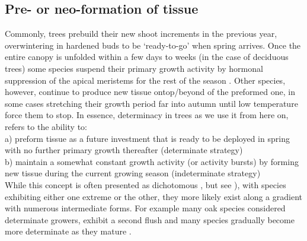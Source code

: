 \documentclass{article}
\begin{document}
	\subsection*{Pre- or neo-formation of tissue}
	Commonly, trees prebuild their new shoot increments in the previous year, overwintering in hardened buds to be `ready-to-go' when spring arrives. Once the entire canopy is unfolded within a few days to weeks (in the case of deciduous trees) some species suspend their primary growth activity by hormonal suppression of the apical meristems for the rest of the season \citep[paradormancy,][]{langEndoParaEcodormancy1987}.  Other species, however, continue to produce new tissue ontop/beyond of the preformed one, in some cases stretching their growth period far into autumn until low temperature force them to stop. In essence, determinacy in trees as we use it from here on, refers to the ability to:\\
	a) preform tissue as a future investment that is ready to be deployed in spring with no further primary growth thereafter (determinate strategy)\\
	b) maintain a somewhat constant growth activity (or activity bursts) by forming new tissue during the current growing season (indeterminate strategy)\\

While this concept is often presented as dichotomous \citep{kozlowskiGrowthControlWoody1997, lechowiczWhyTemperateDeciduous1984a}, but see \citealp{kikuzawaLeafSurvivalWoody1983, damascosBudCompositionBranching2005}), with species exhibiting either one extreme or the other, they more likely exist along a gradient with numerous intermediate forms. For example many oak species considered determinate growers, exhibit a second flush and many species gradually become more determinate as they mature \citep{borchertConceptJuvenilityWoody1976, heuretOntogeneticTrendsMorphological2006}.
	
\end{document}
